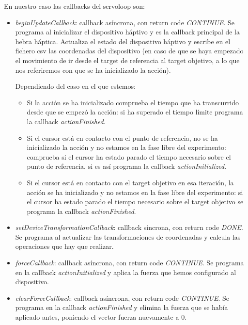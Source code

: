 \documentclass[a4paper,11pt, oneside]{book}
\begin{document}
En nuestro caso las callbacks del servoloop son:
\begin{itemize}
	\item \textit{beginUpdateCallback}: callback asíncrona, con return code \textit{CONTINUE}. Se programa al inicializar el dispositivo háptivo y es la callback principal de la hebra háptica.  Actualiza el estado del dispositivo háptivo y escribe en el fichero csv las coordenadas del dispositivo (en caso de que se haya empezado el movimiento de ir desde el target de referencia al target objetivo, a lo que nos referiremos con que se ha inicializado la acción). 
	
	Dependiendo del caso en el que estemos:
	\begin{itemize}
		\item Si la acción se ha inicializado comprueba el tiempo que ha transcurrido desde que se empezó la acción: si ha superado el tiempo límite programa la callback \textit{actionFinished}.
		\item Si el cursor está en contacto con el punto de referencia, no se ha inicializado la acción y no estamos en la fase libre del experimento: comprueba si el cursor ha estado parado el tiempo necesario sobre el punto de referencia, si es así programa la callback \textit{actionInitialized}.
		\item Si el cursor está en contacto con el target objetivo en esa iteración, la acción se ha inicializado y no estamos en la fase libre del experimento: si el cursor ha estado parado el tiempo necesario sobre el target objetivo se programa la callback \textit{actionFinished}.
	\end{itemize}
	
	\item \textit{setDeviceTransformationCallback}: callback síncrona, con return code \textit{DONE}. Se programa al actualizar las transformaciones de coordenadas y calcula las operaciones que hay que realizar.
	
	\item \textit{forceCallback}: callback asíncrona, con return code \textit{CONTINUE}. Se programa en la callback \textit{actionInitialized} y aplica la fuerza que hemos configurado al dispositivo. 
	
	\item \textit{clearForceCallback}: callback asíncrona, con return code \textit{CONTINUE}. Se programa en la callback \textit{actionFinished} y elimina la fuerza que se había aplicado antes, poniendo el vector fuerza nuevamente a 0. 
	

\end{itemize}
\end{document}
